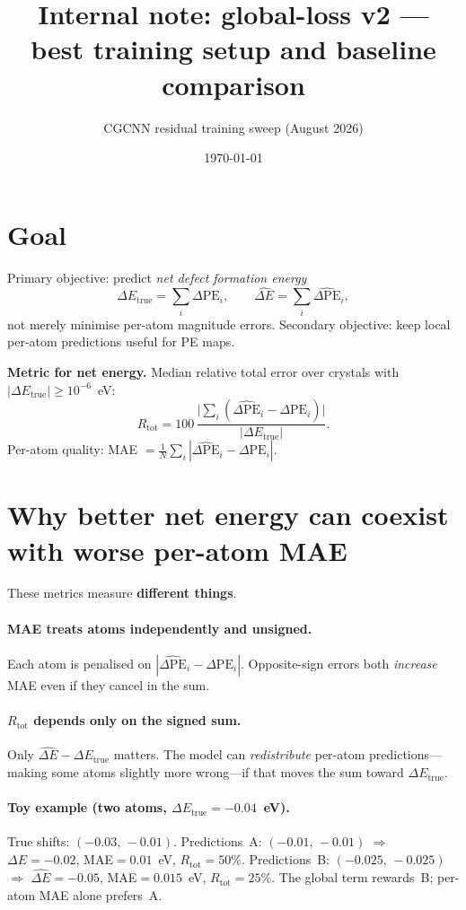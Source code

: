 \documentclass[11pt,a4paper]{article}
\title{\textbf{Internal note:} global-loss v2 --- best training setup and baseline comparison}
\author{CGCNN residual training sweep (August 2026)}
\date{\today}
\newcommand{\dPE}{\Delta\mathrm{PE}}
\newcommand{\dPEhat}{\widehat{\Delta\mathrm{PE}}}
\newcommand{\dEtrue}{\Delta E_{\mathrm{true}}}
\newcommand{\dEhat}{\widehat{\Delta E}}
\begin{document}
\maketitle

\section*{Goal}

Primary objective: predict \emph{net defect formation energy}
\begin{equation}
  \dEtrue = \sum_i \dPE_i,
  \qquad
  \dEhat = \sum_i \dPEhat_i,
\end{equation}
not merely minimise per-atom magnitude errors. Secondary objective: keep local per-atom predictions useful for PE maps.

\medskip
\noindent\textbf{Metric for net energy.} Median relative total error over crystals with $|\dEtrue|\ge 10^{-6}$~eV:
\begin{equation}
  R_{\mathrm{tot}}
  = 100\,\frac{\bigl|\sum_i(\dPEhat_i-\dPE_i)\bigr|}{|\dEtrue|}.
\end{equation}
Per-atom quality: MAE $=\frac{1}{N}\sum_i|\dPEhat_i-\dPE_i|$.

\section*{Why better net energy can coexist with worse per-atom MAE}

These metrics measure \textbf{different things}.

\paragraph{MAE treats atoms independently and unsigned.}
Each atom is penalised on $|\dPEhat_i-\dPE_i|$. Opposite-sign errors both \emph{increase} MAE even if they cancel in the sum.

\paragraph{$R_{\mathrm{tot}}$ depends only on the signed sum.}
Only $\dEhat-\dEtrue$ matters. The model can \emph{redistribute} per-atom predictions---making some atoms slightly more wrong---if that moves the sum toward $\dEtrue$.

\paragraph{Toy example (two atoms, $\dEtrue=-0.04$~eV).}
True shifts: $(-0.03,\,-0.01)$.
Predictions~A: $(-0.01,\,-0.01)$ $\Rightarrow$ $\dEhat=-0.02$, MAE${}=0.01$~eV, $R_{\mathrm{tot}}=50\%$.
Predictions~B: $(-0.025,\,-0.025)$ $\Rightarrow$ $\dEhat=-0.05$, MAE${}=0.015$~eV, $R_{\mathrm{tot}}=25\%$.
The global term rewards~B; per-atom MAE alone prefers~A.
\end{document}
